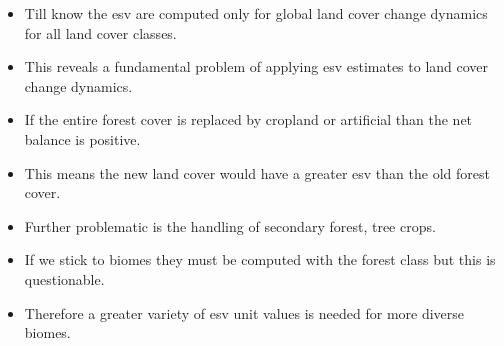 \begin{itemize}
			\item Till know the esv are computed only for global land cover change dynamics for all land cover classes.
			\item This reveals a fundamental problem of applying esv estimates to land cover change dynamics.
			\item If the entire forest cover is replaced by cropland or artificial than the net balance is positive.
			\item This means the new land cover would have a greater esv than the old forest cover.
			\item Further problematic is the handling of secondary forest, tree crops.
			\item If we stick to biomes they must be computed with the forest class but this is questionable.
			\item Therefore a greater variety of esv unit values is needed for more diverse biomes. 
		\end{itemize}
